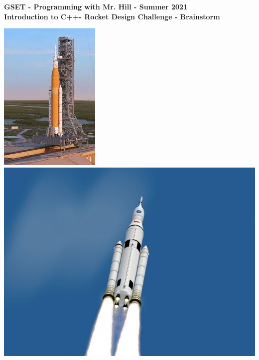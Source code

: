 \documentclass[12pt]{article}
\newcommand{\MNAME}{Introduction to C++} %
\newcommand{\TNAME}{Brainstorm} %
\begin{document}
\thispagestyle{plain}

\begin{center}
   {\bf \large GSET - Programming with Mr. Hill - Summer 2021} \vspace{5mm}\\
   {\bf \Large \MNAME \hspc -  Rocket Design Challenge - \TNAME}\vspace{3mm}\\
   
\end{center}

 \hspace*{3cm}\includegraphics[scale=.6]{rocket_launch.jpeg} \hspace*{1cm}\includegraphics[scale=.28]{Space-Launch.jpg}
\end{document}
